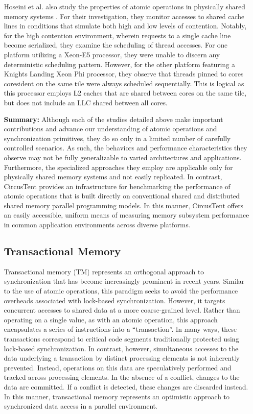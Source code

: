 Hoseini et al. also study the properties of atomic operations in physically shared memory systems \cite{hoseini2019modeling}.
For their investigation, they monitor accesses to shared cache lines in conditions that simulate both high and low levels of contention.
Notably, for the high contention environment, wherein requests to a single cache line become serialized, they examine the scheduling of thread accesses.
For one platform utilizing a Xeon-E5 processor, they were unable to discern any deterministic scheduling pattern.
However, for the other platform featuring a Knights Landing Xeon Phi processor, they observe that threads pinned to cores coresident on the same tile were always scheduled sequentially.
This is logical as this processor employs L2 caches that are shared between cores on the same tile, but does not include an LLC shared between all cores.

\textbf{Summary:} Although each of the studies detailed above make important contributions and advance our understanding of atomic operations and synchronization primitives, they do so only in a limited number of carefully controlled scenarios.
As such, the behaviors and performance characteristics they observe may not be fully generalizable to varied architectures and applications.
Furthermore, the specialized approaches they employ are applicable only for physically shared memory systems and not easily replicated.
In contrast, CircusTent provides an infrastructure for benchmarking the performance of atomic operations that is built directly on conventional shared and distributed shared memory parallel programming models.
In this manner, CircusTent offers an easily accessible, uniform means of measuring memory subsystem performance in common application environments across diverse platforms.

\subsection{Transactional Memory}
\label{subsec:trans_mem}

Transactional memory (TM) represents an orthogonal approach to synchronization that has become increasingly prominent in recent years.
Similar to the use of atomic operations, this paradigm seeks to avoid the performance overheads associated with lock-based synchronization.
However, it targets concurrent accesses to shared data at a more coarse-grained level. 
Rather than operating on a single value, as with an atomic operation, this approach encapsulates a series of instructions into a ``transaction''.
In many ways, these transactions correspond to critical code segments traditionally protected using lock-based synchronization.
In contrast, however, simultaneous accesses to the data underlying a transaction by distinct processing elements is not inherently prevented.
Instead, operations on this data are speculatively performed and tracked across processing elements.
In the absence of a conflict, changes to the data are committed.
If a conflict is detected, these changes are discarded instead.
In this manner, transactional memory represents an optimistic approach to synchronized data access in a parallel environment.

